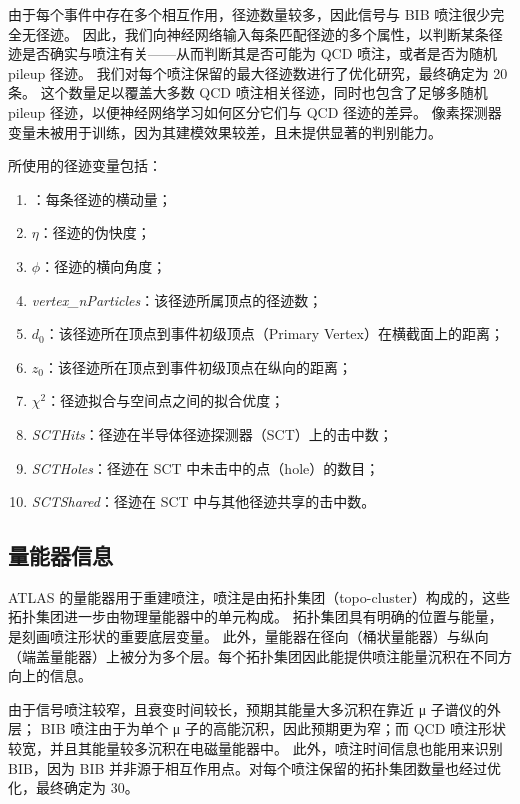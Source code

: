 由于每个事件中存在多个相互作用，径迹数量较多，因此信号与 BIB 喷注很少完全无径迹。
因此，我们向神经网络输入每条匹配径迹的多个属性，以判断某条径迹是否确实与喷注有关——从而判断其是否可能为 QCD 喷注，或者是否为随机 pileup 径迹。
我们对每个喷注保留的最大径迹数进行了优化研究，最终确定为 20 条。
这个数量足以覆盖大多数 QCD 喷注相关径迹，同时也包含了足够多随机 pileup 径迹，以便神经网络学习如何区分它们与 QCD 径迹的差异。
像素探测器变量未被用于训练，因为其建模效果较差，且未提供显著的判别能力。

所使用的径迹变量包括：
\begin{enumerate}
      \item \pt：每条径迹的横动量；
      \item $\eta$：径迹的伪快度；
      \item $\phi$：径迹的横向角度；
      \item \textit{vertex\_nParticles}：该径迹所属顶点的径迹数；
      \item $d_0$：该径迹所在顶点到事件初级顶点（Primary Vertex）在横截面上的距离；
      \item $z_0$：该径迹所在顶点到事件初级顶点在纵向的距离；
      \item $\chi^2$：径迹拟合与空间点之间的拟合优度；
      \item \textit{SCTHits}：径迹在半导体径迹探测器（SCT）上的击中数；
      \item \textit{SCTHoles}：径迹在 SCT 中未击中的点（hole）的数目；
      \item \textit{SCTShared}：径迹在 SCT 中与其他径迹共享的击中数。
\end{enumerate}

\subsection{量能器信息}
ATLAS 的量能器用于重建喷注，喷注是由拓扑集团（topo-cluster）构成的，这些拓扑集团进一步由物理量能器中的单元构成。
拓扑集团具有明确的位置与能量，是刻画喷注形状的重要底层变量。
此外，量能器在径向（桶状量能器）与纵向（端盖量能器）上被分为多个层。每个拓扑集团因此能提供喷注能量沉积在不同方向上的信息。

由于信号喷注较窄，且衰变时间较长，预期其能量大多沉积在靠近 μ 子谱仪的外层；
BIB 喷注由于为单个 μ 子的高能沉积，因此预期更为窄；而 QCD 喷注形状较宽，并且其能量较多沉积在电磁量能器中。
此外，喷注时间信息也能用来识别 BIB，因为 BIB 并非源于相互作用点。对每个喷注保留的拓扑集团数量也经过优化，最终确定为 30。

